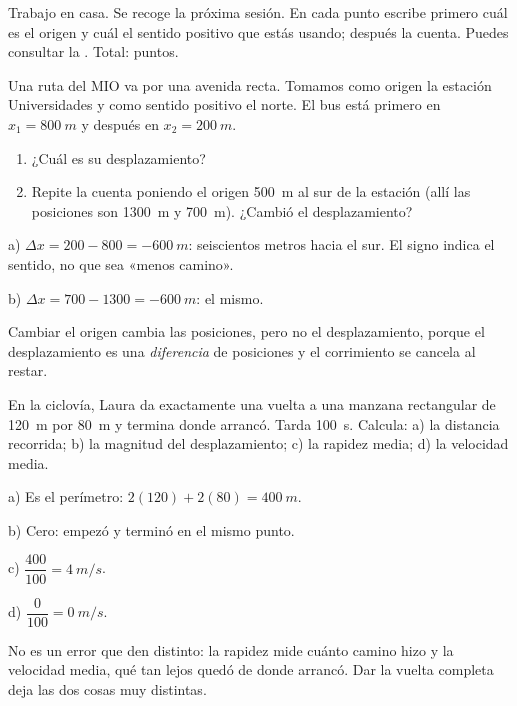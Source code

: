 \documentclass[11pt]{article}
\begin{document}
\encabezado

\begin{instrucciones}
Trabajo en casa. Se recoge la próxima sesión. En cada punto escribe primero cuál es el origen
y cuál el sentido positivo que estás usando; después la cuenta. Puedes consultar la
. Total: \totalpuntos{} puntos.
\end{instrucciones}

\begin{preguntas}

\pregunta[1.25] Una ruta del MIO va por una avenida recta. Tomamos como origen la estación
Universidades y como sentido positivo el norte. El bus está primero en $x_1 = \qty{+800}{m}$ y
después en $x_2 = \qty{+200}{m}$.
\begin{enumerate}[label=\alph*)]
  \item ¿Cuál es su desplazamiento?
  \item Repite la cuenta poniendo el origen \qty{500}{m} al sur de la estación (allí las
        posiciones son \qty{1300}{m} y \qty{700}{m}). ¿Cambió el desplazamiento?
\end{enumerate}
\begin{solucion}[4.5cm]
a) $\Delta x = 200 - 800 = \qty{-600}{m}$: seiscientos metros hacia el sur. El signo indica el
sentido, no que sea «menos camino».

b) $\Delta x = 700 - 1300 = \qty{-600}{m}$: el mismo.

Cambiar el origen cambia las posiciones, pero no el desplazamiento, porque el desplazamiento
es una \emph{diferencia} de posiciones y el corrimiento se cancela al restar.
\end{solucion}

\pregunta[1.5] En la ciclovía, Laura da exactamente una vuelta a una manzana rectangular de
\qty{120}{m} por \qty{80}{m} y termina donde arrancó. Tarda \qty{100}{s}. Calcula: a) la
distancia recorrida; b) la magnitud del desplazamiento; c) la rapidez media; d) la velocidad
media.
\begin{solucion}[5cm]
a) Es el perímetro: $2(120) + 2(80) = \qty{400}{m}$.

b) Cero: empezó y terminó en el mismo punto.

c) $\dfrac{400}{100} = \qty{4}{m/s}$.

d) $\dfrac{0}{100} = \qty{0}{m/s}$.

No es un error que den distinto: la rapidez mide cuánto camino hizo y la velocidad media, qué
tan lejos quedó de donde arrancó. Dar la vuelta completa deja las dos cosas muy distintas.
\end{solucion}


\end{preguntas}
\end{document}
